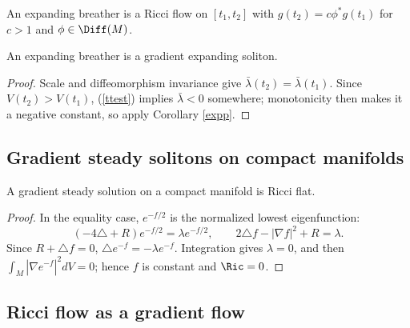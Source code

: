 \begin{definition}
  \label{def:kl-rescaled-invariant-expanding-breather-definition}
An expanding breather is a Ricci flow on $[t_1,t_2]$ with
$g(t_2)=c\phi^*g(t_1)$ for $c>1$ and $\phi\in\Diff(M)$.
\end{definition}

\begin{proposition}
  \label{prop:kl-rescaled-invariant-rigidity-expanding-breathers}
An expanding breather is a gradient expanding soliton.
\end{proposition}
\begin{proof}
\sketch
Scale and diffeomorphism invariance give $\bar\lambda(t_2)=\bar\lambda(t_1)$.
Since $V(t_2)>V(t_1)$, (\ref{ttest}) implies $\bar\lambda<0$ somewhere; monotonicity
then makes it a negative constant, so apply Corollary \ref{expp}.
\end{proof}

\subsection{Gradient steady solitons on compact manifolds}

\begin{proposition}
  \label{prop:kl-gradient-steady-solitons-compact-manifolds-compactness-ricci-solitons}
A gradient steady solution on a compact manifold is Ricci flat.
\end{proposition}
\begin{proof}
\sketch
In the equality case, $e^{-f/2}$ is the normalized lowest eigenfunction:
\[(-4\triangle+R)e^{-f/2}=\lambda e^{-f/2},\qquad2\triangle f-|\nabla f|^2+R=\lambda.\]
Since $R+\triangle f=0$, $\triangle e^{-f}=-\lambda e^{-f}$. Integration gives
$\lambda=0$, and then $\int_M|\nabla e^{-f}|^2dV=0$; hence $f$ is constant and
$\Ric=0$.
\end{proof}

\subsection{Ricci flow as a gradient flow}

